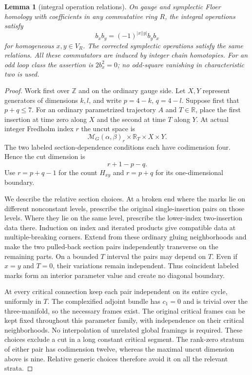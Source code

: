 \documentclass[11pt]{amsart}
\newtheorem{lemma}[theorem]{Lemma}
\theoremstyle{definition}
\theoremstyle{remark}
\theoremstyle{plain}
\newcommand{\ZZ}{\mathbb{Z}}
\newcommand{\RR}{\mathbb{R}}
\newcommand{\cM}{\mathcal{M}}
\begin{document}
\begin{lemma}[integral operation relations]
\label{lem:integral-operation-relations}
On gauge and symplectic Floer homology with coefficients
in any commutative ring $R$, the integral operations satisfy
\[
                       b_xb_y=(-1)^{|x||y|}b_yb_x
\]
for homogeneous $x,y\in V_R$. The corrected symplectic
operations satisfy the same relations. All these
commutators are induced by integer chain homotopies.
For an odd loop class the assertion is $2b_x^2=0$;
no odd-square vanishing in characteristic two is used.
\end{lemma}

\begin{proof}
Work first over $\ZZ$ and on the ordinary gauge side.
Let $X,Y$ represent generators of dimensions $k,l$,
and write $p=4-k$, $q=4-l$. Suppose first that $p+q\leq7$.
For an ordinary parametrized trajectory $A$ and $T\in\RR$,
place the first insertion at time zero along $X$ and
the second at time $T$ along $Y$. At actual integer
Fredholm index $r$ the uncut space is
\[
 \cM_G(\alpha,\beta)_r\times\RR_T\times X\times Y.
\]
The two labeled section-dependence conditions each
have codimension four. Hence the cut dimension is
\begin{equation}\label{eq:ordinary-two-insertion-dimension}
                         r+1-p-q.
\end{equation}
Use $r=p+q-1$ for the count $H_{xy}$ and $r=p+q$
for its one-dimensional boundary.

We describe the relative section choices. At a broken
end where the marks lie on different nonconstant levels,
prescribe the original single-insertion pairs on those
levels. Where they lie on the same level, prescribe
the lower-index two-insertion data there. Induction
on index and iterated products give compatible data
at multiple-breaking corners. Extend from these
ordinary gluing neighborhoods and make the two
pulled-back section pairs independently transverse
on the remaining parts. On a bounded $T$ interval
the pairs may depend on $T$. Even if $x=y$ and
$T=0$, their variations remain independent.
Thus coincident labeled marks form an interior
parameter value and create no diagonal boundary.

At every critical connection keep each pair
independent on its entire cycle, uniformly in $T$.
The complexified adjoint bundle has $c_1=0$ and
is trivial over the three-manifold, so the necessary
frames exist. The original critical frames can be
kept fixed throughout this parameter family, with
independence on their critical neighborhoods.
No interpolation of unrelated global framings is
required. These choices exclude a cut in a long
constant critical segment. The rank-zero stratum
of either pair has codimension twelve, whereas
the maximal uncut dimension above is nine.
Relative generic choices therefore avoid it on
all the relevant strata.


\end{proof}
\end{document}
